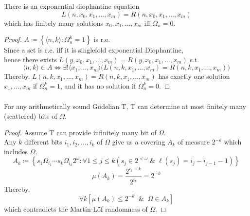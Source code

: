\documentclass[UTF8,11pt,colorlinks,compress,openany]{beamer}%
\begin{document}
\begin{frame}\frametitle{}
	\begin{theorem}
		There is an exponential diophantine equation \[L(n,x_0,x_1,\ldots,x_m)=R(n,x_0,x_1,\ldots,x_m)\] which has finitely many solutions $x_0,x_1,\ldots,x_m$ iff $\Omega_n=0$.
	\end{theorem}
	\begin{proof}
		$A\coloneqq \left\{\langle n,k\rangle: \Omega^k_n=1\right\}$ is r.e.\\
		Since a set is r.e. iff it is singlefold exponential Diophantine,\\
		hence there exists $L(y,x_0,x_1,\ldots,x_m)=R(y,x_0,x_1,\ldots,x_m)$ s.t.
		\[\langle n,k\rangle\in A\iff \exists !\langle x_1,\ldots,x_m\rangle\big(L(n,k,x_1,\ldots,x_m)=R(n,k,x_1,\ldots,x_m)\big)\]
		Thereby, $L(n,k,x_1,\ldots,x_m)=R(n,k,x_1,\ldots,x_m)$ has exactly one solution $x_1,\ldots,x_m$ if $\Omega^k_n=1$, and it has no solution if $\Omega^k_n=0$.
	\end{proof}
\end{frame}

\begin{frame}\frametitle{}
	\begin{theorem}
		For any arithmetically sound G\"odelian $\mathrm{T}$, $\mathrm{T}$ can determine at most finitely many (scattered) bits of $\Omega$.
	\end{theorem}
	\begin{proof}
		Assume $\mathrm{T}$ can provide infinitely many bit of $\Omega$.\\
		Any $k$ different bits $i_1,i_2,\ldots,i_k$ of $\Omega$ give us a covering $A_k$ of measure $2^{-k}$ which includes $\Omega$.
		\[A_k\coloneqq \left\{s_1\Omega_{i_1}\cdots s_k\Omega_{i_k}2^\omega: \forall 1\leq j\leq k\left(s_j\in 2^{<\omega}\;\&\;\ell(s_j)=i_j-i_{j-1}-1\right)\right\}\]
		\[\mu(A_k)=\dfrac{2^{i_k-k}}{2^{i_k}}=2^{-k}\]
		Thereby, \[\forall k\left[\mu(A_k)\leq 2^{-k}\;\;\&\;\;\Omega\in A_k\right]\]
		which contradicts the Martin-L\"of randomness of $\Omega$.
	\end{proof}
\end{frame}
\end{document}
